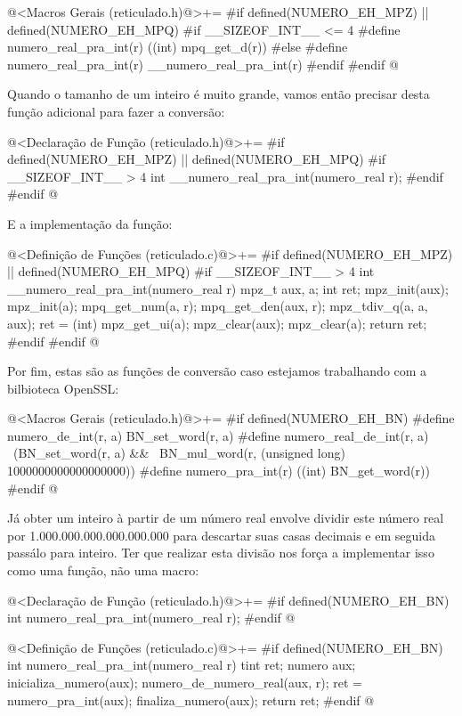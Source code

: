 \iniciocodigo
@<Macros Gerais (reticulado.h)@>+=
#if defined(NUMERO_EH_MPZ) || defined(NUMERO_EH_MPQ)
#if __SIZEOF_INT__ <= 4
#define numero_real_pra_int(r) ((int) mpq_get_d(r))
#else
#define numero_real_pra_int(r) __numero_real_pra_int(r)
#endif
#endif
@
\fimcodigo

Quando o tamanho de um inteiro é muito grande, vamos então precisar
desta função adicional para fazer a conversão:

\iniciocodigo
@<Declaração de Função (reticulado.h)@>+=
#if defined(NUMERO_EH_MPZ) || defined(NUMERO_EH_MPQ)
#if __SIZEOF_INT__ > 4
int __numero_real_pra_int(numero_real r);
#endif
#endif
@
\fimcodigo

E a implementação da função:

\iniciocodigo
@<Definição de Funções (reticulado.c)@>+=
#if defined(NUMERO_EH_MPZ) || defined(NUMERO_EH_MPQ)
#if __SIZEOF_INT__ > 4
int __numero_real_pra_int(numero_real r){
  mpz_t aux, a;
  int ret;
  mpz_init(aux);
  mpz_init(a);
  mpq_get_num(a, r);
  mpq_get_den(aux, r);
  mpz_tdiv_q(a, a, aux);
  ret = (int) mpz_get_ui(a);
  mpz_clear(aux);
  mpz_clear(a);
  return ret;
}
#endif
#endif
@
\fimcodigo

Por fim, estas são as funções de conversão caso estejamos trabalhando
com a bilbioteca OpenSSL:

\iniciocodigo
@<Macros Gerais (reticulado.h)@>+=
#if defined(NUMERO_EH_BN)
#define numero_de_int(r, a) BN_set_word(r, a)
#define numero_real_de_int(r, a) \
          (BN_set_word(r, a) &&  \
           BN_mul_word(r, (unsigned long) 1000000000000000000))
#define numero_pra_int(r) ((int) BN_get_word(r))
#endif
@
\fimcodigo

Já obter um inteiro à partir de um número real envolve dividir este
número real por 1.000.000.000.000.000.000 para descartar suas casas
decimais e em seguida passálo para inteiro. Ter que realizar esta
divisão nos força a implementar isso como uma função, não uma macro:

\iniciocodigo
@<Declaração de Função (reticulado.h)@>+=
#if defined(NUMERO_EH_BN)
int numero_real_pra_int(numero_real r);
#endif
@
\fimcodigo

\iniciocodigo
@<Definição de Funções (reticulado.c)@>+=
#if defined(NUMERO_EH_BN)
int numero_real_pra_int(numero_real r){
  tint ret;
  numero aux;
  inicializa_numero(aux);
  numero_de_numero_real(aux, r);
  ret = numero_pra_int(aux);
  finaliza_numero(aux);
  return ret;
}
#endif
@
\fimcodigo




